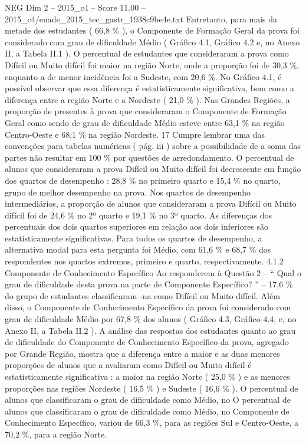 \begin{textsample}{NEG Dim 2 – 2015\_c4 – Score 11.00 – 2015\_c4/enade\_2015\_tec\_gastr\_1938c9be4e.txt}
Entretanto, para mais da metade dos estudantes ( 66,8 \% ), o Componente de Formação Geral da prova foi considerado com grau de dificuldade Médio ( Gráfico 4.1, Gráfico 4.2 e, no Anexo II, a Tabela II.1 ).
O percentual de estudantes que consideraram a prova como Difícil ou Muito difícil foi maior na região Norte, onde a proporção foi de 30,3 \%, enquanto a de menor incidência foi a Sudeste, com 20,6 \%.
No Gráfico 4.1, é possível observar que essa diferença é estatisticamente significativa, bem como a diferença entre a região Norte e a Nordeste ( 21,0 \% ).
Nas Grandes Regiões, a proporção de presentes à prova que consideraram o Componente de Formação Geral como sendo de grau de dificuldade Médio esteve entre 63,1 \% na região Centro-Oeste e 68,1 \% na região Nordeste. 17 Cumpre lembrar uma das convenções para tabelas numéricas ( pág. iii ) sobre a possibilidade de a soma das partes não resultar em 100 \% por questões de arredondamento.
O percentual de alunos que consideraram a prova Difícil ou Muito difícil foi decrescente em função dos quartos de desempenho : 28,8 \% no primeiro quarto e 15,4 \% no quarto, grupo de melhor desempenho na prova.
Nos quartos de desempenho intermediários, a proporção de alunos que consideraram a prova Difícil ou Muito difícil foi de 24,6 \% no 2º quarto e 19,1 \% no 3º quarto.
As diferenças dos percentuais dos dois quartos superiores em relação aos dois inferiores são estatisticamente significativas.
Para todos os quartos de desempenho, a alternativa modal para esta pergunta foi Médio, com 61,6 \% e 68,7 \% dos respondentes nos quartos extremos, primeiro e quarto, respectivamente. 4.1.2 Componente de Conhecimento Específico Ao responderem à Questão 2 – “ Qual o grau de dificuldade desta prova na parte de Componente Específico? ” – 17,6 \% do grupo de estudantes classificaram -na como Difícil ou Muito difícil.
Além disso, o Componente de Conhecimento Específico da prova foi considerado com grau de dificuldade Médio por 67,8 \% dos alunos ( Gráfico 4.3, Gráfico 4.4, e, no Anexo II, a Tabela II.2 ).
A análise das respostas dos estudantes quanto ao grau de dificuldade do Componente de Conhecimento Específico da prova, agregado por Grande Região, mostra que a diferença entre a maior e as duas menores proporções de alunos que a avaliaram como Difícil ou Muito difícil é estatisticamente significativa : a maior na região Norte ( 25,0 \% ) e as menores proporções nas regiões Nordeste ( 16,5 \% ) e Sudeste ( 16,6 \% ).
O percentual de alunos que classificaram o grau de dificuldade como Médio, no O percentual de alunos que classificaram o grau de dificuldade como Médio, no Componente de Conhecimento Específico, variou de 66,3 \%, para as regiões Sul e Centro-Oeste, a 70,2 \%, para a região Norte.

\end{textsample}
